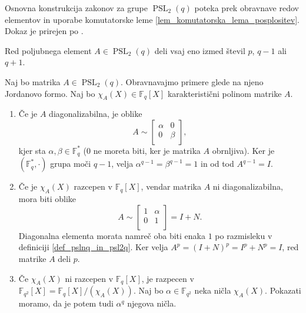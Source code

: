     Osnovna konstrukcija zakonov za grupe $\operatorname{PSL}_2(q)$ poteka prek obravnave redov elementov in uporabe komutatorske leme \ref{lem_komutatorska_lema_posplositev}.
    Dokaz je prirejen po \cite[str.~36--37]{Schneider_2016}. 
    \begin{lema}
    \label{lem_redi_elementov_v_psl2q}
    Red poljubnega element $A \in  \operatorname{PSL}_2(q)$ deli vsaj eno izmed števil $p$, $q-1$ ali $q + 1$. 
    \end{lema}
    \begin{dokaz}
    Naj bo matrika $A \in \operatorname{PSL}_2(q)$. Obravnavajmo primere glede na njeno Jordanovo formo. Naj bo $\chi_A(X) \in \mathbb{F}_q[X]$ karakteristični polinom matrike $A$. 
    \begin{enumerate}
        \item Če je $A$ diagonalizabilna, je oblike \begin{equation*}
        A \sim  \begin{bmatrix}
            \alpha & 0 \\
            0 & \beta \\
        \end{bmatrix},
        \end{equation*}  
          kjer sta $\alpha, \beta \in  \mathbb{F}_q^{*}$ (0 ne moreta biti, ker je matrika $A$ obrnljiva). Ker je $(\mathbb{F}_q^{*}, \cdot)$ grupa moči $q-1$, velja $\alpha^{q-1} = \beta^{q -1} = 1$ in od tod $A^{q-1} = I$.
          \item Če je $\chi_A(X)$ razcepen v $\mathbb{F}_q[X]$, vendar matrika $A$ ni diagonalizabilna, mora biti oblike \begin{equation*}
          A \sim  \begin{bmatrix}
            1 & \alpha\\
            0 & 1\\
          \end{bmatrix} = I + N.
          \end{equation*}  
        Diagonalna elementa morata namreč oba biti enaka $1$ po razmisleku v definiciji \ref{def_pslnq_in_psl2q}. Ker velja $A^{p} = (I + N)^{p} = I^{p} + N^{p} = I$, red matrike $A$ deli $p$.  
    \item Če $\chi_A(X)$ ni razcepen v $\mathbb{F}_q[X]$, je razpecen v  $\mathbb{F}_{q^2}[X] = \mathbb{F}_q[X] / (\chi_A(X))$. Naj bo $\alpha \in \mathbb{F}_{q^2}$ neka ničla $\chi_A(X)$. Pokazati moramo, da je potem tudi $\alpha^q$ njegova ničla.

\end{enumerate}
\end{dokaz}
